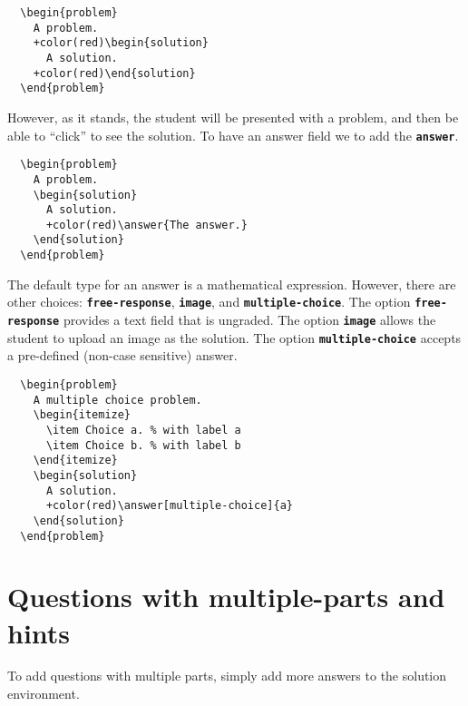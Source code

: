 \documentclass{amsart}
\newcommand\code[1]{{\bfseries\texttt{#1}}}
\begin{document}
\begin{Verbatim}
  \begin{problem}
    A problem.
    +color(red)\begin{solution}
      A solution. 
    +color(red)\end{solution}
  \end{problem}
\end{Verbatim}

However, as it stands, the student will be presented with a problem,
and then be able to ``click'' to see the solution. To have an answer
field we to add the \code{answer}.

\begin{Verbatim}
  \begin{problem}
    A problem.
    \begin{solution}
      A solution. 
      +color(red)\answer{The answer.}
    \end{solution}
  \end{problem}
\end{Verbatim}

The default type for an answer is a mathematical expression. However,
there are other choices: \code{free-response}, \code{image}, and
\code{multiple-choice}. The option \code{free-response} provides a
text field that is ungraded. The option \code{image} allows the
student to upload an image as the solution. The option
\code{multiple-choice} accepts a pre-defined (non-case sensitive)
answer.

\begin{Verbatim}
  \begin{problem}
    A multiple choice problem.
    \begin{itemize}
      \item Choice a. % with label a
      \item Choice b. % with label b
    \end{itemize}
    \begin{solution}
      A solution. 
      +color(red)\answer[multiple-choice]{a}
    \end{solution}
  \end{problem}
\end{Verbatim}



\section{Questions with multiple-parts and hints}

To add questions with multiple parts, simply add more answers to the
solution environment.
\end{document}
